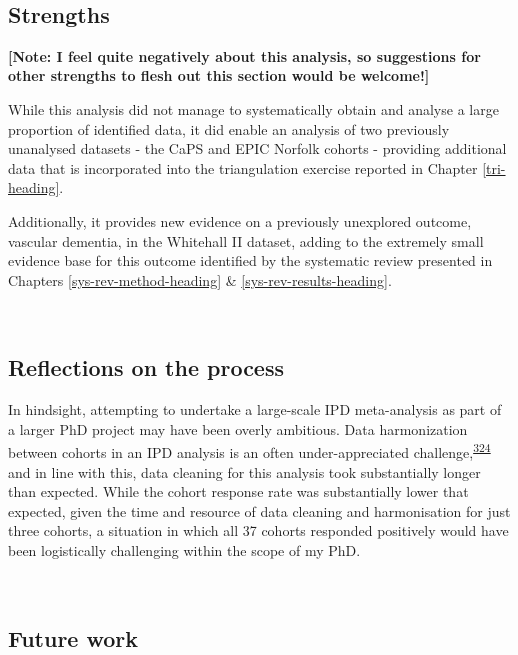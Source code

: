 \documentclass[a4paper, twoside]{templates/ociamthesis}
\begin{document}
~

\hypertarget{strengths-1}{%
\subsection{Strengths}\label{strengths-1}}

\textbf{{[}Note: I feel quite negatively about this analysis, so suggestions for other strengths to flesh out this section would be welcome!{]}}

While this analysis did not manage to systematically obtain and analyse a large proportion of identified data, it did enable an analysis of two previously unanalysed datasets - the CaPS and EPIC Norfolk cohorts - providing additional data that is incorporated into the triangulation exercise reported in Chapter \ref{tri-heading}.

Additionally, it provides new evidence on a previously unexplored outcome, vascular dementia, in the Whitehall II dataset, adding to the extremely small evidence base for this outcome identified by the systematic review presented in Chapters \ref{sys-rev-method-heading} \& \ref{sys-rev-results-heading}.

~

\hypertarget{reflections-on-the-process}{%
\subsection{Reflections on the process}\label{reflections-on-the-process}}

In hindsight, attempting to undertake a large-scale IPD meta-analysis as part of a larger PhD project may have been overly ambitious. Data harmonization between cohorts in an IPD analysis is an often under-appreciated challenge,\textsuperscript{\protect\hyperlink{ref-levis2021}{324}} and in line with this, data cleaning for this analysis took substantially longer than expected. While the cohort response rate was substantially lower that expected, given the time and resource of data cleaning and harmonisation for just three cohorts, a situation in which all 37 cohorts responded positively would have been logistically challenging within the scope of my PhD.

~

\hypertarget{future-work}{%
\subsection{Future work}\label{future-work}}
\end{document}
